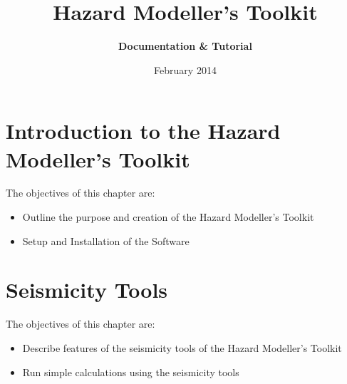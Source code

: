 \documentclass[11pt,a4paper,headings=small,dvips]{scrbook}
\newenvironment{myfancybox}{%
  \def\FrameCommand{\fboxsep=\FrameSep \fcolorbox{blue01}{honeydew}}%
  \color{black}\MakeFramed {\FrameRestore}}%
 {\endMakeFramed}
\begin{document}
\setcounter{page}{1}

\begin{titlepage}
	\title{ \textcolor{blue01}{\textsf{\bfseries\Huge 
        Hazard Modeller's Toolkit
        }}}
	\subtitle{ \textcolor{blue01}{\textsf{\bfseries\LARGE
        Documentation \& Tutorial}}}
	\date{February 2014}
 
	\publishers{GEM Foundation, Pavia}
\end{titlepage}
\pagestyle{scrheadings}
\maketitle
%
\tableofcontents
\cleardoublepage
% 
\chapter{Introduction to the Hazard Modeller's Toolkit}
\begin{myfancybox}
The objectives of this chapter are:
\begin{itemize}
    \item Outline the purpose and creation of the Hazard Modeller's Toolkit 
    \item Setup and Installation of the Software
\end{itemize}
\end{myfancybox}
  
\cleardoublepage

\chapter{Seismicity Tools}
\begin{myfancybox}
The objectives of this chapter are:
\begin{itemize}
    \item Describe features of the seismicity tools of the Hazard Modeller's Toolkit 
    \item Run simple calculations using the seismicity tools
\end{itemize}
\end{myfancybox}
  
\cleardoublepage
\end{document}
